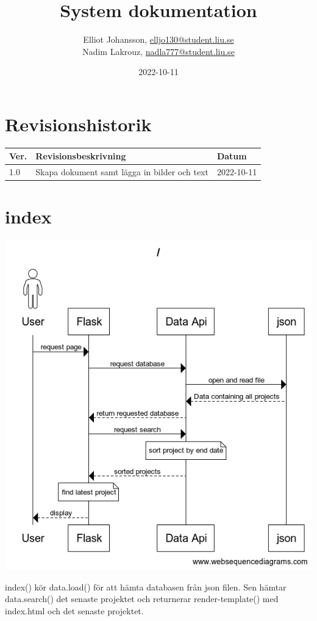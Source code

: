 \documentclass{TDP003mall}
\author{Elliot Johansson, \url{elljo130@student.liu.se}\\
Nadim Lakrouz, \url{nadla777@student.liu.se}}
\title{System dokumentation}
\date{2022-10-11}
\begin{document}
\projectpage
\section{Revisionshistorik}
\begin{table}[!h]
\begin{tabularx}{\linewidth}{|l|X|l|}
\hline
Ver. & Revisionsbeskrivning & Datum \\\hline
1.0 & Skapa dokument samt lägga in bilder och text & 2022-10-11 \\\hline

\end{tabularx}
\end{table}

\section{index}
\begin{center}
\includegraphics[scale=0.35]{index.png}
\end{center}
index() kör data.load() för att hämta databasen från json filen. Sen hämtar data.search() det senaste projektet och returnerar render-template() med index.html och det senaste projektet.\\\\
\end{document}
